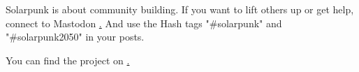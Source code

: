 \newpage

Solarpunk is about community building. If you want to lift others up or get help, connect to Mastodon \href{https://dice.camp/@solarpunk2050}. And use the Hash tags "#solarpunk" and "#solarpunk2050" in your posts.


You can find the project on \href{https://solarpunk2050.com/}.
